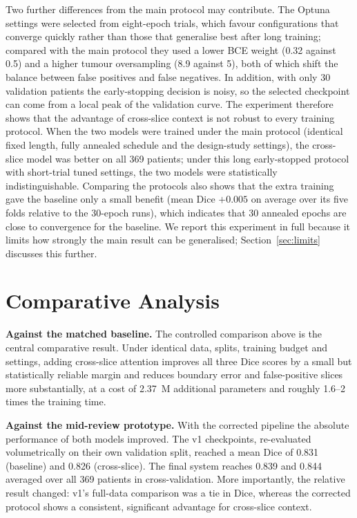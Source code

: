 Two further differences from the main protocol may contribute. The Optuna settings were selected from eight-epoch trials, which favour configurations that converge quickly rather than those that generalise best after long training; compared with the main protocol they used a lower BCE weight (0.32 against 0.5) and a higher tumour oversampling (8.9 against 5), both of which shift the balance between false positives and false negatives. In addition, with only 30 validation patients the early-stopping decision is noisy, so the selected checkpoint can come from a local peak of the validation curve. The experiment therefore shows that the advantage of cross-slice context is not robust to every training protocol. When the two models were trained under the main protocol (identical fixed length, fully annealed schedule and the design-study settings), the cross-slice model was better on all 369 patients; under this long early-stopped protocol with short-trial tuned settings, the two models were statistically indistinguishable. Comparing the protocols also shows that the extra training gave the baseline only a small benefit (mean Dice $+0.005$ on average over its five folds relative to the 30-epoch runs), which indicates that 30 annealed epochs are close to convergence for the baseline. We report this experiment in full because it limits how strongly the main result can be generalised; Section~\ref{sec:limits} discusses this further.

\section{Comparative Analysis}
\textbf{Against the matched baseline.} The controlled comparison above is the central comparative result. Under identical data, splits, training budget and settings, adding cross-slice attention improves all three Dice scores by a small but statistically reliable margin and reduces boundary error and false-positive slices more substantially, at a cost of 2.37~M additional parameters and roughly 1.6--2 times the training time.

\textbf{Against the mid-review prototype.} With the corrected pipeline the absolute performance of both models improved. The v1 checkpoints, re-evaluated volumetrically on their own validation split, reached a mean Dice of 0.831 (baseline) and 0.826 (cross-slice). The final system reaches 0.839 and 0.844 averaged over all 369 patients in cross-validation. More importantly, the relative result changed: v1's full-data comparison was a tie in Dice, whereas the corrected protocol shows a consistent, significant advantage for cross-slice context.

